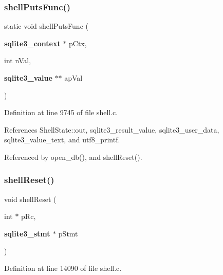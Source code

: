 \subsubsection{shell\+Puts\+Func()}
{\footnotesize\ttfamily static void shell\+Puts\+Func (\begin{DoxyParamCaption}\item[{\textbf{ sqlite3\+\_\+context} $\ast$}]{p\+Ctx,  }\item[{int}]{n\+Val,  }\item[{\textbf{ sqlite3\+\_\+value} $\ast$$\ast$}]{ap\+Val }\end{DoxyParamCaption})\hspace{0.3cm}{\ttfamily [static]}}



Definition at line 9745 of file shell.\+c.



References Shell\+State\+::out, sqlite3\+\_\+result\+\_\+value, sqlite3\+\_\+user\+\_\+data, sqlite3\+\_\+value\+\_\+text, and utf8\+\_\+printf.



Referenced by open\+\_\+db(), and shell\+Reset().


\mbox{\label{shell_8c_a463b17126de60f0595b9bec9067baca8}} 
\subsubsection{shell\+Reset()}
{\footnotesize\ttfamily void shell\+Reset (\begin{DoxyParamCaption}\item[{int $\ast$}]{p\+Rc,  }\item[{\textbf{ sqlite3\+\_\+stmt} $\ast$}]{p\+Stmt }\end{DoxyParamCaption})}



Definition at line 14090 of file shell.\+c.



